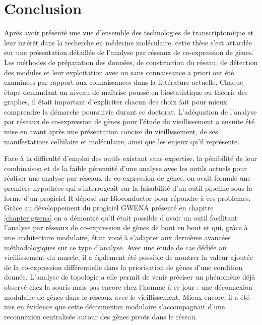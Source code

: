 \chapter*{Conclusion}         %


Après avoir présenté une vue d'ensemble des technologies de transcriptomique et leur intérêt dans la recherche en médecine moléculaire, cette thèse s'est attardée sur une présentation détaillée de l'analyse par réseaux de co-expression de gènes. Les méthodes de préparation des données, de construction du réseau, de détection des modules et leur exploitation avec ou sans connaissance a priori ont été examinées par rapport aux connaissances dans la littérature actuelle. Chaque étape demandant un niveau de maîtrise poussé en biostatistique ou théorie des graphes, il était important d'expliciter chacun des choix fait pour mieux comprendre la démarche poursuivie durant ce doctorat. 
L'adéquation de l'analyse par réseaux de co-expression de gènes pour l'étude du vieillissement a ensuite été mise en avant après une présentation concise du vieillissement, de ses manifestations cellulaire et moléculaire, ainsi que les enjeux qu'il représente.

Face à la difficulté d'emploi des outils existant sans expertise, la pénibilité de leur combinaison et de la faible pérennité d'une analyse avec les outils actuels pour réaliser une analyse par réseaux de co-expression de gènes, on avait formulé une première hypothèse qui s'interrogeait sur la faisabilité d'un outil pipeline sous la forme d'un progiciel R déposé sur Bioconductor pour répondre à ces problèmes. Grâce au développement du progiciel GWENA présenté en chapitre \ref{chapter:gwena} on a démontré qu'il était possible d'avoir un outil facilitant l'analyse par réseaux de co-expression de gènes de bout en bout et qui, grâce à une architecture modulaire, était voué à s'adapter aux dernières avancées méthodologiques sur ce type d'analyse. Avec une étude de cas dédiée au vieillissement du muscle, il a également été possible de montrer la valeur ajoutée de la co-expression différentielle dans la priorisation de gènes d'une condition donnée. L'analyse de topologie a elle permit de venir préciser un phénomène déjà observé chez la souris mais pas encore chez l'homme à ce jour : une déconnexion modulaire de gènes dans le réseaux avec le vieillissement. Mieux encore, il a été mis en évidence que cette déconnexion modulaire s'accompagnait d'une reconnexion centralisée autour des gènes pivots dans le réseau.

